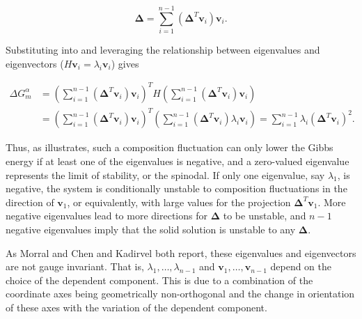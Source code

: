 \begin{equation} \label{eq:projection}
    \boldsymbol{\Delta} = \sum_{i=1}^{n-1} (\boldsymbol{\Delta}^T\boldsymbol{v}_i)\boldsymbol{v}_i.
\end{equation}

\noindent Substituting  into  and leveraging the relationship between eigenvalues and eigenvectors ($H\boldsymbol{v}_i=\lambda_i\boldsymbol{v}_i$) gives

\begin{equation}\label{eq:final_delta_G}
\begin{split}
    \Delta G^\alpha_m &= \left(\sum_{i=1}^{n-1}(\boldsymbol{\Delta}^T\boldsymbol{v}_i)\boldsymbol{v}_i\right)^TH\left(\sum_{i=1}^{n-1}(\boldsymbol{\Delta}^T\boldsymbol{v}_i)\boldsymbol{v}_i\right)\\&=\left(\sum_{i=1}^{n-1}(\boldsymbol{\Delta}^T\boldsymbol{v}_i)\boldsymbol{v}_i\right)^T\left(\sum_{i=1}^{n-1}(\boldsymbol{\Delta}^T\boldsymbol{v}_i)\lambda_i\boldsymbol{v}_i\right)=\sum_{i=1}^{n-1}\lambda_i(\boldsymbol{\Delta}^T\boldsymbol{v}_i)^2.
    \end{split}
\end{equation}

\noindent Thus, as  illustrates, such a composition fluctuation can only lower the Gibbs energy if at least one of the eigenvalues is negative, and a zero-valued eigenvalue represents the limit of stability, or the spinodal. If only one eigenvalue, say $\lambda_1$, is negative, the system is conditionally unstable to composition fluctuations in the direction of $\boldsymbol{v}_1$, or equivalently, with large values for the projection $\boldsymbol{\Delta}^T\boldsymbol{v}_1$. More negative eigenvalues lead to more directions for $\boldsymbol{\Delta}$ to be unstable, and $n-1$ negative eigenvalues imply that the solid solution is unstable to any $\boldsymbol{\Delta}$.

As Morral and Chen \cite{morral2021stability} and Kadirvel \etal \cite{kadirvel2022exploration} both report, these eigenvalues and eigenvectors are not gauge invariant. That is, $\lambda_1,\hdots,\lambda_{n-1}$ and $\boldsymbol{v}_1,\hdots,\boldsymbol{v}_{n-1}$ depend on the choice of the dependent component. This is due to a combination of the coordinate axes being geometrically non-orthogonal and the change in orientation of these axes with the variation of the dependent component. 

